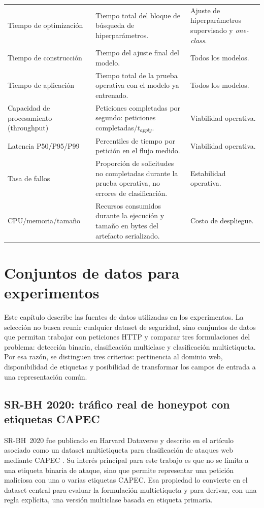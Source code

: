 \documentclass[12pt,oneside]{report}
\begin{document}
\begin{longtable}{@{}L{0.24\textwidth}L{0.43\textwidth}L{0.25\textwidth}@{}}
Tiempo de optimización & Tiempo total del bloque de búsqueda de hiperparámetros. & Ajuste de hiperparámetros supervisado y \textit{one-class}. \\
Tiempo de construcción & Tiempo del ajuste final del modelo.  & Todos los modelos. \\
Tiempo de aplicación & Tiempo total de la prueba operativa con el modelo ya entrenado. & Todos los modelos. \\
Capacidad de procesamiento (throughput) & Peticiones completadas por segundo: peticiones completadas/$t_{apply}$. & Viabilidad operativa. \\
Latencia P50/P95/P99 & Percentiles de tiempo por petición en el flujo medido. & Viabilidad operativa. \\
Tasa de fallos & Proporción de solicitudes no completadas durante la prueba operativa, no errores de clasificación. & Estabilidad operativa. \\
CPU/memoria/tamaño & Recursos consumidos durante la ejecución y tamaño en bytes del artefacto serializado. & Costo de despliegue. \\
\bottomrule
\end{longtable}



\chapter{Conjuntos de datos para experimentos}

Este capítulo describe las fuentes de datos utilizadas en los experimentos. La selección no busca reunir cualquier dataset de seguridad, sino conjuntos de datos que permitan trabajar con peticiones HTTP y comparar tres formulaciones del problema: detección binaria, clasificación multiclase y clasificación multietiqueta. Por esa razón, se distinguen tres criterios: pertinencia al dominio web, disponibilidad de etiquetas y posibilidad de transformar los campos de entrada a una representación común.

\section{SR-BH 2020: tráfico real de honeypot con etiquetas CAPEC}
SR-BH~2020 fue publicado en Harvard Dataverse y descrito en el artículo asociado como un dataset multietiqueta para clasificación de ataques web mediante CAPEC \cite{srbh_dataverse,srbh_paper}. Su interés principal para este trabajo es que no se limita a una etiqueta binaria de ataque, sino que permite representar una petición maliciosa con una o varias etiquetas CAPEC. Esa propiedad lo convierte en el dataset central para evaluar la formulación multietiqueta y para derivar, con una regla explícita, una versión multiclase basada en etiqueta primaria.
\end{document}
